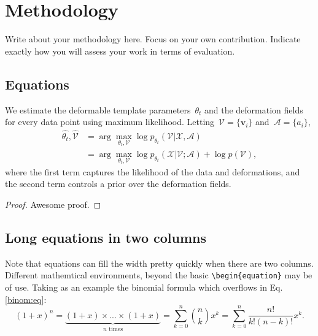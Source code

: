 \chapter{Methodology}
\label{sec:methodology}
Write about your methodology here. Focus on your own contribution. Indicate exactly how you will assess your work in terms of evaluation.

\section{Equations}
        We estimate the deformable template parameters~$\theta_t$ and the deformation fields for every data point using maximum likelihood. Letting~$\mathcal{V} = \{\boldsymbol{v}_i\}$ and~$\mathcal{A} = \{a_i\}$,
        \begin{align}
                \hat{\theta_t}, \hat{\mathcal{V}} &= \arg \max_{\theta_t, \mathcal{V}} \log p_{\theta_t}(\mathcal{V} | \mathcal{X},  \mathcal{A}) \nonumber \\
                &= \arg \max_{\theta_t, \mathcal{V}} \log p_{\theta_t}(\mathcal{X} | \mathcal{V}; \mathcal{A}) + \log p(\mathcal{V}),
                \label{eq:logpost}
        \end{align}
        where the first term captures the likelihood of the data and deformations, and the second term controls a prior over the deformation fields.

        \begin{proof}
                Awesome proof.
        \end{proof}

\section{Long equations in two columns}
        Note that equations can fill the width pretty quickly when there are two columns.
        Different mathemtical environments, beyond the basic \verb|\begin{equation}| may be of use. Taking as an example the binomial formula which overflows in Eq. \eqref{binom:eq}:
        \begin{equation}
                \label{binom:eq}
                (1+x)^n = \underbrace{(1+x)\times...\times(1+x)}_{n \text{ times}} = \sum_{k=0}^n \binom{n}{k}x^k = \sum_{k=0}^n\frac{n!}{k!(n-k)!}x^k .
        \end{equation}


